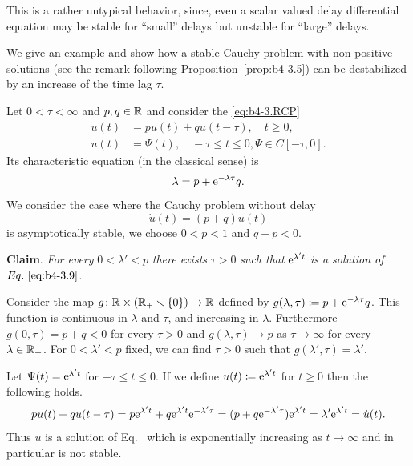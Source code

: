 This is a rather untypical behavior, since, even a scalar valued delay differential equation may be stable for \enquote{small} delays but unstable for \enquote{large} delays.
	
We give an example and show how a stable Cauchy problem with non-positive solutions (see the remark following Proposition~\ref{prop:b4-3.5}) can be destabilized by an increase of the time lag $\tau$.
	
Let $0 < \tau < \infty$ and $p,q \in \mathbb{R}$ and consider the \eqref{eq:b4-3.RCP}
\begin{equation}\label{eq:b4-3.9}
    \begin{aligned}
		\dot{u}(t) &= pu(t) + qu(t-\tau) ,  \quad t \geq 0 ,\\
		u(t)       &= \Psi(t) ,             \quad -\tau \leq t \leq 0 , \Psi \in C[-\tau,0] .
	\end{aligned}
\end{equation}
Its characteristic equation (in the classical sense) is 
\begin{equation}\label{eq:b4-3.10}
 \lambda = p + \mathrm{e}^{-\lambda\tau}q .
\end{equation}
We consider the case where the Cauchy problem without delay
\[
\dot{u}(t) = (p + q)u(t)
\]
is asymptotically stable, \ie we choose $0 < p < 1$ and $q + p < 0$.

\textbf{Claim}.
	\textit{For every} $0 < \lambda' < p$ \textit{there exists} $\tau > 0$ \textit{such that} $\mathrm{e}^{\lambda't}$ \textit{is a solution of} $Eq.~\eqref{eq:b4-3.9}$.

Consider the map $g \colon \mathbb{R}\times(\mathbb{R}_{+}\smallsetminus\{0\}) \to \mathbb{R}$ defined by $g(\lambda,\tau) \coloneq p + \mathrm{e}^{-\lambda\tau}q$.
This function is continuous in $\lambda$ and $\tau$, and increasing in $\lambda$.
Furthermore $g(0,\tau) = p + q < 0$ for every $\tau > 0$ and $g(\lambda,\tau) \to p$ as $\tau \to \infty$ for every $\lambda \in \mathbb{R}_{+}$.
For $0 < \lambda' < p$ fixed, we can find $\tau > 0$ such that $g(\lambda',\tau) = \lambda'$.

Let $\Psi(t) = \mathrm{e}^{\lambda't}$ for $-\tau \leq t \leq 0$. 
If we define $u(t) \coloneq \mathrm{e}^{\lambda't}$ for $t \geq 0$ then the following holds.
\[
pu(t) + qu(t-\tau) = p\mathrm{e}^{\lambda't} + q\mathrm{e}^{\lambda't}\mathrm{e}^{-\lambda'\tau} = (p+q\mathrm{e}^{-\lambda'\tau})\mathrm{e}^{\lambda't} = \lambda'\mathrm{e}^{\lambda't} = \dot{u}(t) .
\]
Thus $u$ is a solution of\/ Eq.~ which is exponentially increasing as $t \to \infty$ and 
in particular is not stable.

